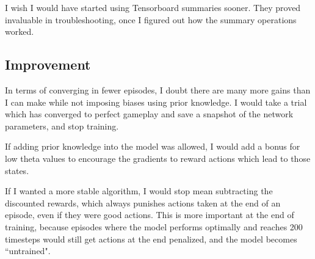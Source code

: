 \documentclass[12pt,a4paper]{article}
\begin{document}
I wish I would have started using Tensorboard summaries sooner. They proved invaluable in troubleshooting, once I figured out how the summary operations worked.

\subsection*{Improvement}

In terms of converging in fewer episodes, I doubt there are many more gains than I can make while not imposing biases using prior knowledge. I would take a trial which has converged to perfect gameplay and save a snapshot of the network parameters, and stop training.

If adding prior knowledge into the model was allowed, I would add a bonus for low theta values to encourage the gradients to reward actions which lead to those states.

If I wanted a more stable algorithm, I would stop mean subtracting the discounted rewards, which always punishes actions taken at the end of an episode, even if they were good actions. This is more important at the end of training, because episodes where the model performs optimally and reaches 200 timesteps would still get actions at the end penalized, and the model becomes ``untrained". 

%
%
\end{document}
